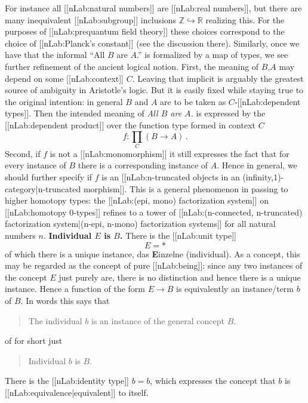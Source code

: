 \documentclass[12pt,titlepage]{article}
\theoremstyle{plain}
\theoremstyle{definition}
\theoremstyle{remark}
\begin{document}
For instance all [[nLab:natural numbers]] are [[nLab:real numbers]], but there are many inequivalent [[nLab:subgroup]] inclusions $\mathbb{Z}\hookrightarrow \mathbb{R}$ realizing this. For the purposes of [[nLab:prequantum field theory]] these choices correspond to the choice of [[nLab:Planck's constant]] (see the discussion there).
Similarly, once we have that the informal ``All $B$ are $A$.'' is formalized by a map of types, we see further refinement of the ancient logical notion.
First, the meaning of $B$,$A$ may depend on some [[nLab:context]] $C$. Leaving that implicit is arguably the greatest source of ambiguity in Aristotle's logic. But it is easily fixed while staying true to the original intention: in general $B$ and $A$ are to be taken as $C$-[[nLab:dependent types]]. Then the intended meaning of \emph{All $B$ are $A$.} is expressed by the [[nLab:dependent product]] over the function type formed in context $C$
\begin{displaymath}
f\colon \underset{C}{\prod} (B \longrightarrow A)
  \,.
\end{displaymath}
Second, if $f$ is not a [[nLab:monomorphism]] it still expresses the fact that for every instance of $B$ there is a corresponding instance of $A$. Hence in general, we should further specify if $f$ is an [[nLab:n-truncated objects in an (infinity,1)-category|n-truncated morphism]]. This is a general phenomenon in passing to higher homotopy types: the [[nLab:(epi, mono) factorization system]] on [[nLab:homotopy 0-types]] refines to a tower of [[nLab:(n-connected, n-truncated) factorization system|(n-epi, n-mono) factorization systems]] for all natural numbers $n$.
\textbf{Individual $E$ is $B$.}
There is the [[nLab:unit type]]
\begin{displaymath}
E = \ast
\end{displaymath}
of which there is a unique instance, das \textbf{E}inzelne (individual). As a concept, this may be regarded as the concept of pure [[nLab:being]]: since any two instances of the concept $E$ just purely are, there is no distinction and hence there is a unique instance.
Hence a function of the form $E \longrightarrow B$ is equivalently an instance/term $b$ of $B$. In words this says that
\begin{quote}%
The individual $b$ is an instance of the general concept $B$.
\end{quote}
of for short just
\begin{quote}%
Individual $b$ is $B$.
\end{quote}
There is the [[nLab:identity type]] $b = b$, which expresses the concept that $b$ is [[nLab:equivalence|equivalent]] to itself.
\end{document}

